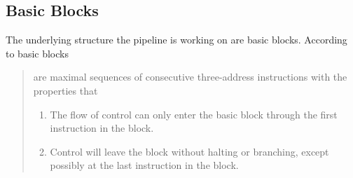 \subsection{Basic Blocks}\label{subsec:basicBlock}
The underlying structure the pipeline is working on are basic blocks.
According to \cite[chapter 8.4, p.~525]{Drachenbuch} basic blocks

\begin{quotation}\noindent
    \grqq[...] are maximal sequences of consecutive three-address instructions with the properties that
    \begin{enumerate}[label=(\alph*)]
        \item The flow of control can only enter the basic block through the first instruction in the block.
        \item Control will leave the block without halting or branching, except possibly at the last instruction in the block.\grqq
    \end{enumerate}
\end{quotation}
